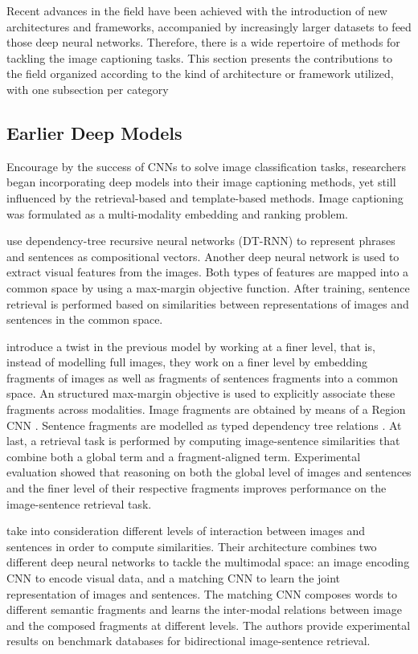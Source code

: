 Recent advances in the field have been achieved with the introduction of new architectures and frameworks, accompanied by increasingly larger datasets to feed those deep neural networks. Therefore, there is a wide repertoire of methods for tackling the image captioning tasks. This section presents the contributions to the field organized according to the kind of architecture or framework utilized, with one subsection per category

\subsection{Earlier Deep Models}

Encourage by the success of CNNs to solve image classification tasks, researchers began incorporating deep models into their image captioning methods, yet still influenced by the retrieval-based and template-based methods. Image captioning was formulated as a multi-modality embedding \citet{Frome2013} and ranking problem.

\citet{Socher2014} use dependency-tree recursive neural networks (DT-RNN) to represent phrases and sentences as compositional vectors. Another deep neural network \citep{Le2013} is used to extract visual features from the images. Both types of  features are mapped into a common space by using a max-margin objective function. After training, sentence retrieval is performed based on similarities between representations of images and sentences in the common space.

\citet{Karpathy2014} introduce a twist in the previous model by working at a finer level, that is, instead of modelling full images, they work on a finer level by embedding fragments of images as well as fragments of sentences fragments into a common space.  An structured max-margin objective is used to explicitly associate these fragments across modalities. Image fragments are obtained by means of a Region CNN \citep{Girshick2014}. Sentence fragments are modelled as typed dependency tree relations \citep{DeMarneffe2006}. At last, a retrieval task is performed by computing image-sentence similarities that combine both a global term and a fragment-aligned term. Experimental evaluation showed that reasoning on both the global level of images and sentences and the finer level of their respective fragments improves performance on the image-sentence retrieval task.

\citet{Ma2015} take into consideration different levels of interaction between images and sentences in order to compute similarities. Their architecture combines two different deep neural networks to tackle the multimodal space: an image encoding CNN \citep{Simonyan2015} to encode visual data, and a matching CNN \citep{Hu2014} to learn the joint representation of images and sentences. The matching CNN composes words to different semantic fragments and learns the inter-modal relations between image and the composed fragments at different levels. The authors provide experimental results on benchmark databases for bidirectional image-sentence retrieval.

